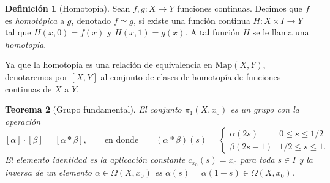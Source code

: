 \documentclass[11pt,a4paper]{article}
\theoremstyle{plain}
\newtheorem{theorem}{Teorema}[section]
\theoremstyle{definition}
\newtheorem{definition}[theorem]{Definición}
\theoremstyle{remark}
\begin{document}
\begin{definition}[Homotopía]
\label{def:homotopia-func}
Sean $f,g:X\to Y$ funciones continuas. Decimos que $f$ es \emph{homotópica}
a $g$, denotado $f\simeq g$, si existe una función continua $H:X\times I\to Y$
tal que $H(x,0)=f(x)$ y $H(x,1)=g(x)$. A tal función $H$ se le llama una
\emph{homotopía}.

Ya que la homotopía es una relación de equivalencia en $\mathrm{Map}(X,Y)$,
denotaremos por $[X,Y]$ al conjunto de clases de homotopía de funciones
continuas de $X$ a $Y$.
\end{definition}

\begin{theorem}[Grupo fundamental]
\label{thm:pi1-grupo}
El conjunto $\pi_1(X,x_0)$ es un grupo con la operación
\[
[\alpha]\cdot[\beta]=[\alpha*\beta], \qquad \text{en donde} \qquad
(\alpha*\beta)(s)=\begin{cases}\alpha(2s) & 0\le s\le 1/2\\ \beta(2s-1) & 1/2\le s\le 1.\end{cases}
\]
El elemento identidad es la aplicación constante $c_{x_0}(s)=x_0$ para toda
$s\in I$ y la inversa de un elemento $\alpha\in\Omega(X,x_0)$ es
$\overline\alpha(s)=\alpha(1-s)\in\Omega(X,x_0)$.
\end{theorem}
\end{document}

